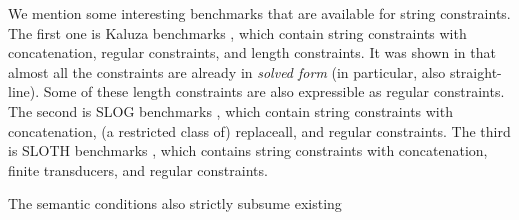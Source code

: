 We mention some interesting benchmarks that are available for  string constraints. The first one is Kaluza 
 benchmarks \cite{Berkeley-JavaScript}, which contain
 string constraints with concatenation, regular constraints, and length
 constraints. It was shown in \cite{Vijay-length}
 that almost all the constraints are already in
 \emph{solved form} (in particular, also straight-line). Some of these length
 constraints are also expressible as regular constraints.
 The second is SLOG benchmarks \cite{fang-yu-circuits}, which contain
 string constraints with concatenation, (a restricted class of) replaceall, and 
 regular constraints. The third is SLOTH benchmarks \cite{HJLRV18}, which
 contains string constraints with concatenation, finite transducers, and
 regular constraints. 
 
% 

The semantic conditions also strictly subsume existing
